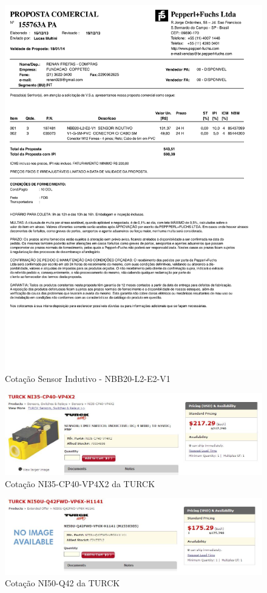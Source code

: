 \begin{figure}[h!]
 \centering
 \includegraphics[width=1\columnwidth]{Indutivo/price_quote_0.pdf}
 \caption{Cotação Sensor Indutivo - NBB20-L2-E2-V1 }
  
\end{figure}

\begin{figure}[h!]
 \centering
 \includegraphics[width=1\columnwidth]{Indutivo/price_quote_1}
 \caption{Cotação NI35-CP40-VP4X2 da TURCK}
  
\end{figure}

\begin{figure}[h!]
 \centering
 \includegraphics[width=1\columnwidth]{Indutivo/price_quote_2}
 \caption{Cotação NI50-Q42 da TURCK }
  
\end{figure}